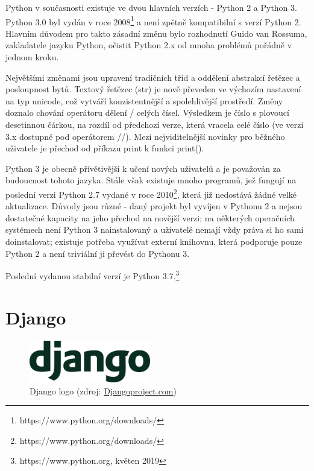 Python v současnosti existuje ve dvou hlavních verzích - Python 2 a Python 3. Python 3.0 byl vydán v roce 2008\footnote{https://www.python.org/downloads/} a není zpětně kompatibilní s verzí Python 2. Hlavním důvodem pro takto zásadní změnu bylo rozhodnutí Guido van Rossuma, zakladatele jazyku Python, očistit Python 2.x od mnoha problémů pořádně v jednom kroku. 

Největšími změnami jsou upravení tradičních tříd a oddělení abstrakcí \textsf{řetězec} a \textsf{posloupnost bytů}. Textový řetězec (\textsf{str}) je nově převeden ve výchozím nastavení na typ unicode, což vytváří konzistentnější a spolehlivější prostředí. Změny doznalo chování operátoru dělení \textsf{/} celých čísel. Výsledkem je číslo s plovoucí desetinnou čárkou, na rozdíl od předchozí verze, která vracela celé číslo (ve verzi 3.x dostupné pod operátorem \textsf{//}). Mezi nejviditelnější novinky pro běžného uživatele je přechod od příkazu \textsf{print} k funkci \textsf{print()}. 

Python 3 je obecně přívětivější k učení nových uživatelů a je považován za budoucnost tohoto jazyka. Stále však existuje mnoho programů, jež fungují na poslední verzi Python 2.7 vydané v roce 2010\footnote{https://www.python.org/downloads/}, která již nedostává žádné velké aktualizace. Důvody jsou různé - daný projekt byl vyvíjen v Pythonu 2 a nejsou dostatečné kapacity na jeho přechod na novější verzi; na některých operačních systémech není Python 3 nainstalovaný a uživatelé nemají vždy práva si ho sami doinstalovat; existuje potřeba využívat externí knihovnu, která podporuje pouze Python 2 a není triviální ji převést do Pythonu 3. 

Poslední vydanou stabilní verzí je Python 3.7.\footnote{https://www.python.org, květen 2019} 

\section{Django}

\begin{figure}[H] \centering
      \includegraphics[width=150pt]{./pictures/django-logo-positive.png}
      \caption[Django logo]{Django logo (zdroj:
\href{https://static.djangoproject.com/img/logos/django-logo-positive.png}{Djangoproject.com})}
      \label{fig:django}
  \end{figure}

